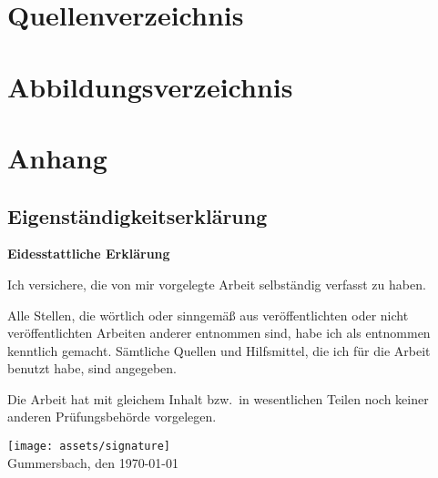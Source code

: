 \appendix

\newpage


\section{Quellenverzeichnis}
%
\printbibliography


\section{Abbildungsverzeichnis}
\listoffigures

\newpage


\section{Anhang}

\subsection{Eigenständigkeitserklärung}

\textbf{Eidesstattliche Erklärung}

Ich versichere, die von mir vorgelegte Arbeit selbständig verfasst zu haben.

Alle Stellen, die wörtlich oder sinngemäß aus veröffentlichten oder nicht veröffentlichten Arbeiten anderer entnommen sind, habe ich als entnommen kenntlich gemacht.
Sämtliche Quellen und Hilfsmittel, die ich für die Arbeit benutzt habe, sind angegeben.

Die Arbeit hat mit gleichem Inhalt bzw.\ in wesentlichen Teilen noch keiner anderen Prüfungsbehörde vorgelegen.

\texttt{[image: assets/signature]}\\
Gummersbach, den \today
